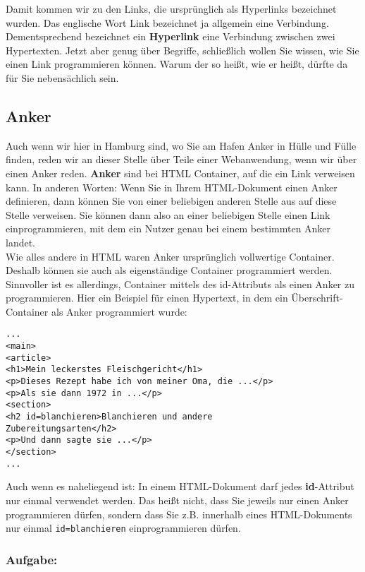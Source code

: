 Damit kommen wir zu den Links, die ursprünglich als Hyperlinks bezeichnet wurden. Das englische Wort Link bezeichnet ja allgemein eine Verbindung. Dementsprechend bezeichnet ein \textbf{Hyperlink} eine Verbindung zwischen zwei Hypertexten. Jetzt aber genug über Begriffe, schließlich wollen Sie wissen, wie Sie einen Link programmieren können. Warum der so heißt, wie er heißt, dürfte da für Sie nebensächlich sein.

\subsection{Anker}

Auch wenn wir hier in Hamburg sind, wo Sie am Hafen Anker in Hülle und Fülle finden, reden wir an dieser Stelle über Teile einer Webanwendung, wenn wir über einen Anker reden. \textbf{Anker} sind bei HTML Container, auf die ein Link verweisen kann. In anderen Worten: Wenn Sie in Ihrem HTML-Dokument einen Anker definieren, dann können Sie von einer beliebigen anderen Stelle aus auf diese Stelle verweisen. Sie können dann also an einer beliebigen Stelle einen Link einprogrammieren, mit dem ein Nutzer genau bei einem bestimmten Anker landet.\\

Wie alles andere in HTML waren Anker ursprünglich vollwertige Container. Deshalb können sie auch als eigenständige Container programmiert werden. Sinnvoller ist es allerdings, Container mittels des id-Attributs als einen Anker zu programmieren. Hier ein Beispiel für einen Hypertext, in dem ein Überschrift-Container als Anker programmiert wurde:

\begin{verbatim}
...
<main>
<article>
<h1>Mein leckerstes Fleischgericht</h1>
<p>Dieses Rezept habe ich von meiner Oma, die ...</p>
<p>Als sie dann 1972 in ...</p>
<section>
<h2 id=blanchieren>Blanchieren und andere 
Zubereitungsarten</h2>
<p>Und dann sagte sie ...</p>
</section>
... 
\end{verbatim}

Auch wenn es naheliegend ist: In einem HTML-Dokument darf jedes \textbf{id}-Attribut nur einmal verwendet werden. Das heißt nicht, dass Sie jeweils nur einen Anker programmieren dürfen, sondern dass Sie z.B. innerhalb eines HTML-Dokuments nur einmal \verb|id=blanchieren| einprogrammieren dürfen.

\subsubsection{Aufgabe:}

